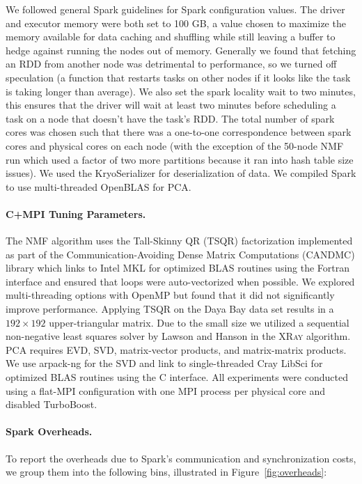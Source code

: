 We followed general Spark guidelines for Spark configuration values. The driver and executor memory were both set to 100 GB, a value chosen to maximize the memory available for data caching and shuffling while still leaving a buffer to hedge against running the nodes out of memory.  Generally we found that fetching an RDD from another node was detrimental to performance, so we turned off speculation (a function that restarts tasks on other nodes if it looks like the task is taking longer than average). We also set the spark locality wait to two minutes, this ensures that the driver will wait at least two minutes before scheduling a task on a node that doesn't have the task's RDD. The total number of spark cores was chosen such that there was a one-to-one correspondence between spark cores and physical cores on each node (with the exception of the 50-node NMF run which used a factor of two more partitions because it ran into hash table size issues). We used the KryoSerializer for deserialization of data. We compiled Spark to use multi-threaded OpenBLAS for PCA.

\paragraph{C+MPI Tuning Parameters.}
The NMF algorithm uses the Tall-Skinny QR (TSQR) \cite{ballard14,demmel12} factorization implemented as part of the Communication-Avoiding Dense Matrix Computations (CANDMC) library \cite{Solomonik14} which links to Intel MKL for optimized BLAS routines using the Fortran interface and ensured that loops were auto-vectorized when possible. We explored multi-threading options with OpenMP but found that it did not significantly improve performance. Applying TSQR on the Daya Bay data set results in a $192 \times 192$ upper-triangular matrix. Due to the small size we utilized a sequential non-negative least squares solver by Lawson and Hanson \cite{lawson95} in the \textsc{XRay} algorithm. PCA requires EVD, SVD, matrix-vector products, and matrix-matrix products. We use arpack-ng \cite{Lehoucq97} for the SVD and link to single-threaded Cray LibSci for optimized BLAS routines using the C interface. All experiments were conducted using a flat-MPI configuration with one MPI process per physical core and disabled TurboBoost.

\paragraph{Spark Overheads.}
To report the overheads due to Spark's communication and synchronization costs, we group them into the following bins, illustrated in Figure~\ref{fig:overheads}:

